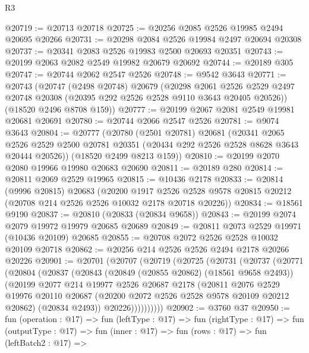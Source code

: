 \begin{lexlean}{R3}
\begin{coremodule}
@20719 := @20713 @20718
@20725 := @20256 @2085 @2526 @19985 @2494 @20695 @20266
@20731 := @20298 @2084 @2526 @19984 @2497 @20694 @20308
@20737 := @20341 @2083 @2526 @19983 @2500 @20693 @20351
@20743 := @20199 @2063 @2082 @2549 @19982 @20679 @20692
@20744 := @20189 @305
@20747 := @20744 @2062 @2547 @2526
@20748 := @9542 @3643
@20771 := @20743
    (@20747
      (@2498 @20748)
      @20679
      (@20298
        @2061
        @2526
        @2529
        @2497
        @20748
        @20308
        (@20395 @292 @2526 @2528 @9110 @3643 @20405 @20526))
      (@18520 @2496 @8708 @159))
@20777 := @20199 @2067 @2081 @2549 @19981 @20681 @20691
@20780 := @20744 @2066 @2547 @2526
@20781 := @9074 @3643
@20804 := @20777
    (@20780
      (@2501 @20781)
      @20681
      (@20341
        @2065
        @2526
        @2529
        @2500
        @20781
        @20351
        (@20434 @292 @2526 @2528 @8628 @3643 @20444 @20526))
      (@18520 @2499 @8213 @159))
@20810 := @20199 @2070 @2080 @19966 @19980 @20683 @20690
@20811 := @20189 @280
@20814 := @20811 @2069 @2529 @19965
@20815 := @10436 @2178
@20833 := @20814
    (@9996 @20815)
    @20683
    (@20200
      @1917
      @2526
      @2528
      @9578
      @20815
      @20212
      (@20708 @214 @2526 @2526 @10032 @2178 @20718 @20226))
@20834 := @18561 @9190
@20837 := @20810 (@20833 (@20834 @9658))
@20843 := @20199 @2074 @2079 @19972 @19979 @20685 @20689
@20849 := @20811 @2073 @2529 @19971 (@10436 @20109) @20685
@20855 := @20708 @2072 @2526 @2528 @10032 @20109 @20718
@20862 := @20256 @214 @2526 @2526 @2494 @2178 @20266 @20226
@20901 := @20701
    (@20707
      (@20719
        (@20725
          (@20731
            (@20737
              (@20771
                (@20804
                  (@20837
                    (@20843
                      (@20849 (@20855 @20862) (@18561 @9658 @2493))
                      (@20199
                        @2077
                        @214
                        @19977
                        @2526
                        @20687
                        @2178
                        (@20811
                          @2076
                          @2529
                          @19976
                          @20110
                          @20687
                          (@20200 @2072 @2526 @2528 @9578 @20109 @20212 @20862)
                          (@20834 @2493))
                        @20226))))))))))
@20902 := @3760 @37
@20950 := fun (operation : @17) =>
  fun (leftType : @17) =>
  fun (rightType : @17) =>
  fun (outputType : @17) =>
  fun (inner : @17) =>
  fun (rows : @17) =>
  fun (leftBatch2 : @17) =>

\end{coremodule}
\end{lexlean}
